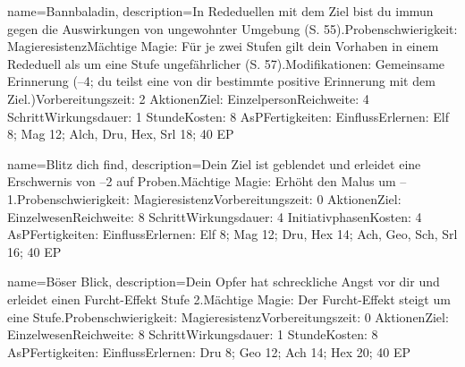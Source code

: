 {
    name={Bannbaladin},
    description={In Rededuellen mit dem Ziel bist du immun gegen die Auswirkungen von ungewohnter Umgebung (S. 55).\newline Probenschwierigkeit: Magieresistenz\newline Mächtige Magie: Für je zwei Stufen gilt dein Vorhaben in einem Rededuell als um eine Stufe ungefährlicher (S. 57).\newline Modifikationen: Gemeinsame Erinnerung (–4; du teilst eine von dir bestimmte positive Erinnerung mit dem Ziel.)\newline Vorbereitungszeit: 2 Aktionen\newline Ziel: Einzelperson\newline Reichweite: 4 Schritt\newline Wirkungsdauer: 1 Stunde\newline Kosten: 8 AsP\newline Fertigkeiten: Einfluss\newline Erlernen: Elf 8; Mag 12; Alch, Dru, Hex, Srl 18; 40 EP}
}


{
    name={Blitz dich find},
    description={Dein Ziel ist geblendet und erleidet eine Erschwernis von –2 auf Proben.\newline Mächtige Magie: Erhöht den Malus um –1.\newline Probenschwierigkeit: Magieresistenz\newline Vorbereitungszeit: 0 Aktionen\newline Ziel: Einzelwesen\newline Reichweite: 8 Schritt\newline Wirkungsdauer: 4 Initiativphasen\newline Kosten: 4 AsP\newline Fertigkeiten: Einfluss\newline Erlernen: Elf 8; Mag 12; Dru, Hex 14; Ach, Geo, Sch, Srl 16; 40 EP}
}


{
    name={Böser Blick},
    description={Dein Opfer hat schreckliche Angst vor dir und erleidet einen Furcht-Effekt Stufe 2.\newline Mächtige Magie: Der Furcht-Effekt steigt um eine Stufe.\newline Probenschwierigkeit: Magieresistenz\newline Vorbereitungszeit: 0 Aktionen\newline Ziel: Einzelwesen\newline Reichweite: 8 Schritt\newline Wirkungsdauer: 1 Stunde\newline Kosten: 8 AsP\newline Fertigkeiten: Einfluss\newline Erlernen: Dru 8; Geo 12; Ach 14; Hex 20; 40 EP}
}


